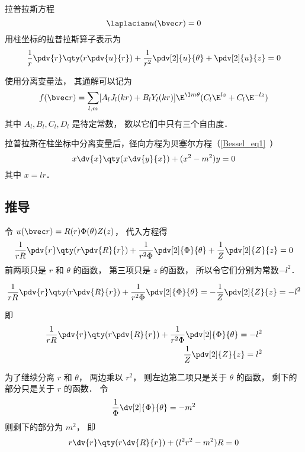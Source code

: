

拉普拉斯方程
\begin{equation}
\laplacian u(\bvec r) = 0
\end{equation}
用柱坐标的拉普拉斯算子表示为
\begin{equation}
\frac{1}{r}\pdv{r}\qty(r \pdv{u}{r}) + \frac{1}{r^2} \pdv[2]{u}{\theta} + \pdv[2]{u}{z} = 0
\end{equation}

使用分离变量法， 其通解可以记为
\begin{equation}
f(\bvec r) = \sum_{l,m} [A_l J_l(kr) + B_l Y_l(kr)]\E^{\I m \theta} (C_l\E^{lz} + C_l \E^{-lz})
\end{equation}
其中 $A_l, B_l, C_l, D_l$ 是待定常数， 数以它们中只有三个自由度．

拉普拉斯在柱坐标中分离变量后，径向方程为贝塞尔方程（\autoref{Bessel_eq1}~）
\begin{equation}
x \dv{x} \qty(x \dv{y}{x}) + (x^2 - m^2)y = 0
\end{equation}
其中 $x = lr$．

\subsection{推导}
令 $u(\bvec r) = R(r) \Phi(\theta) Z(z)$， 代入方程得
\begin{equation}
\frac{1}{rR}\pdv{r} \qty(r\pdv{R}{r}) + \frac{1}{r^2 \Phi} \pdv[2]{\Phi}{\theta} + \frac{1}{Z} \pdv[2]{Z}{z} = 0
\end{equation}
前两项只是 $r$ 和 $\theta $ 的函数， 第三项只是 $z$ 的函数， 所以令它们分别为常数$-l^2$． 

\begin{equation}
\frac{1}{rR}\pdv{r} \qty(r\pdv{R}{r}) + \frac{1}{r^2 \Phi} \pdv[2]{\Phi}{\theta} = - \frac{1}{Z} \pdv[2]{Z}{z} = -l^2
\end{equation}

即
\begin{align}
\frac{1}{rR} \pdv{r} \qty(r\pdv{R}{r}) + \frac{1}{r^2 \Phi} \pdv[2]{\Phi}{\theta} =  - l^2\\
\label{CylLap_eq4}
\frac{1}{Z} \pdv[2]{Z}{z} = l^2\\
\end{align}

为了继续分离 $r$ 和 $\theta$， 两边乘以 $r^2$，   则左边第二项只是关于 $\theta$  的函数， 剩下的部分只是关于 $r$ 的函数． 令
\begin{equation}\label{CylLap_eq6}
\frac{1}{\Phi } \dv[2]{\Phi}{\theta} = -m^2
\end{equation}
则剩下的部分为 $m^2$， 即
\begin{equation}\label{CylLap_eq7}
r \dv{r} \qty(r\dv{R}{r}) + (l^2 r^2 - m^2)R = 0
\end{equation}

